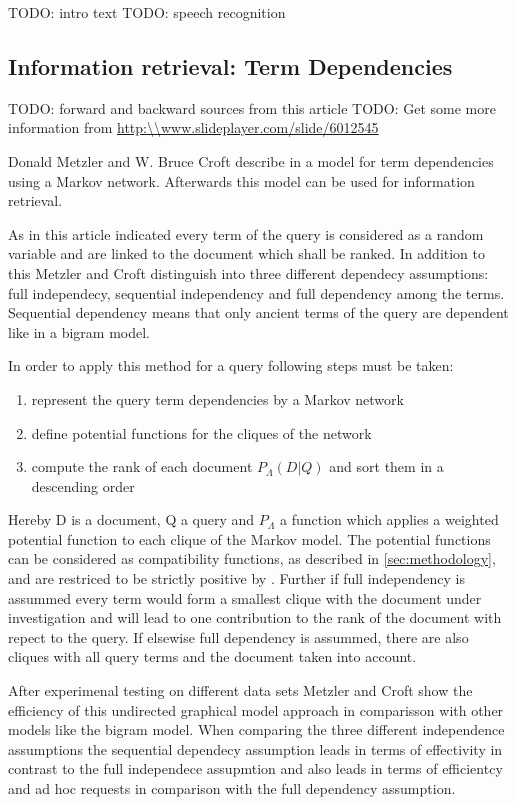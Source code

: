 TODO: intro text
TODO: speech recognition

\subsection{Information retrieval: Term Dependencies}

TODO: forward and backward sources from this article \cite{metzler2005markov}
TODO: Get some more information from \url{http:\\www.slideplayer.com/slide/6012545}

Donald Metzler and W. Bruce Croft describe in \cite{metzler2005markov} a model for term dependencies using a Markov network. Afterwards this model can be used for information retrieval.

As in this article indicated every term of the query is considered as a random variable and are linked to the document which shall be ranked. In addition to this Metzler and Croft distinguish into three different dependecy assumptions: full independecy, sequential independency and full dependency among the terms. Sequential dependency means that only ancient terms of the query are dependent like in a bigram model.

In order to apply this method for a query following steps must be taken:
\begin{enumerate}
\item represent the query term dependencies by a Markov network
\item define potential functions for the cliques of the network
\item compute the rank of each document $P_\Lambda (D|Q)$ and sort them in a descending order
\end{enumerate}

Hereby D is a document, Q a query and $P_\Lambda$ a function which applies a weighted potential function to each clique of the Markov model. The potential functions can be considered as compatibility functions, as described in \ref{sec:methodology}, and are restriced to be strictly positive by \cite{metzler2005markov}. Further if full independency is assummed every term would form a smallest clique with the document under investigation and will lead to one contribution to the rank of the document with repect to the query. If elsewise full dependency is assummed, there are also cliques with all query terms and the document taken into account.

After experimenal testing on different data sets Metzler and Croft show the efficiency of this undirected graphical model approach in comparisson with other models like the bigram model. When comparing the three different independence assumptions the sequential dependecy assumption leads in terms of effectivity in contrast to the full independece assupmtion and also leads in terms of efficientcy and ad hoc requests in comparison with the full dependency assumption.


